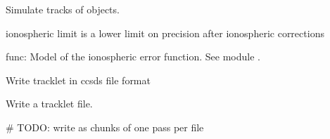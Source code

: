 \documentclass[letterpaper,10pt,english]{sphinxmanual}
\begin{document}
\begin{fulllineitems}
\label{\detokenize{modules/simulate_tracklet:simulate_tracklet.create_tracklet}}
Simulate tracks of objects.

ionospheric limit is a lower limit on precision after ionospheric corrections

\end{fulllineitems}


\begin{fulllineitems}
\label{\detokenize{modules/simulate_tracklet:simulate_tracklet.iono_errfun}}
func: Model of the ionospheric error function. See module {\hyperref[\detokenize{modules/debris:module-debris}]{}}.

\end{fulllineitems}


\begin{fulllineitems}
\label{\detokenize{modules/simulate_tracklet:simulate_tracklet.write_ccsds}}
Write tracklet in ccsds file format

\end{fulllineitems}


\begin{fulllineitems}
\label{\detokenize{modules/simulate_tracklet:simulate_tracklet.write_tracklets}}
Write a tracklet file.

\# TODO: write as chunks of one pass per file

\end{fulllineitems}
\end{document}
